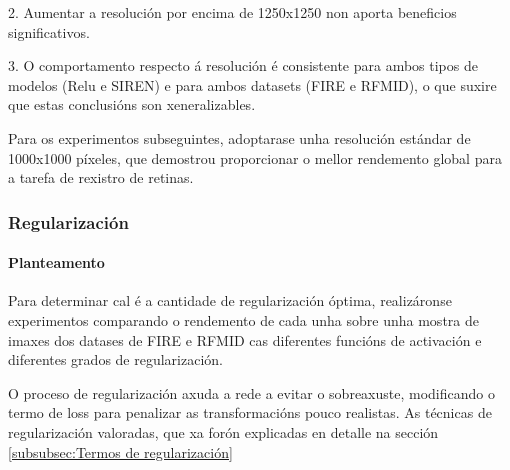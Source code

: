 2. Aumentar a resolución por encima de 1250x1250 non aporta beneficios significativos.

3. O comportamento respecto á resolución é consistente para ambos tipos de modelos (Relu e SIREN) e para ambos datasets (FIRE e RFMID), o que suxire que estas conclusións son xeneralizables.

Para os experimentos subseguintes, adoptarase unha resolución estándar de 1000x1000 píxeles, que demostrou proporcionar o mellor rendemento global para a tarefa de rexistro de retinas.

\subsubsection{Regularización}
\label{subsubsec:Regularización}

\paragraph{Planteamento}
\label{par:Planteamento-regularization}

Para determinar cal é a cantidade de regularización óptima, realizáronse experimentos comparando o rendemento de cada unha sobre unha mostra de imaxes dos datases de FIRE e RFMID cas diferentes funcións de activación e diferentes grados de regularización.

O proceso de regularización axuda a rede a evitar o sobreaxuste, modificando o termo de loss para penalizar as transformacións pouco realistas.
As técnicas de regularización valoradas, que xa forón explicadas en detalle na sección \ref{subsubsec:Termos de regularización}


